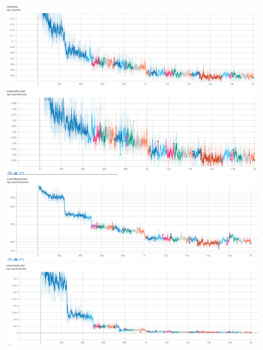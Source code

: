     \begin{figure}[H]
      \begin{minipage}{0.5\linewidth}
        \centering
        \includegraphics[width=\linewidth]{images/chapter5_img/LossPlots/Tensorboard_Losses/NFFB/NFFB_loss_PLot65.jpg}
      \end{minipage}%
      \begin{minipage}{0.5\linewidth}
        \centering
        \includegraphics[width=\linewidth]{images/chapter5_img/LossPlots/Tensorboard_Losses/NFFB/NFFB_RGBloss_PLot65.jpg}
      \end{minipage}
      \begin{minipage}{0.5\linewidth}
        \centering
        \includegraphics[width=\linewidth]{images/chapter5_img/LossPlots/Tensorboard_Losses/NFFB/NFFB_Eikonalloss_PLot65.jpg}
      \end{minipage}%
      \begin{minipage}{0.5\linewidth}
        \centering
        \includegraphics[width=\linewidth]{images/chapter5_img/LossPlots/Tensorboard_Losses/NFFB/NFFB_Maskloss_PLot65.jpg}

\end{minipage}
\end{figure}
